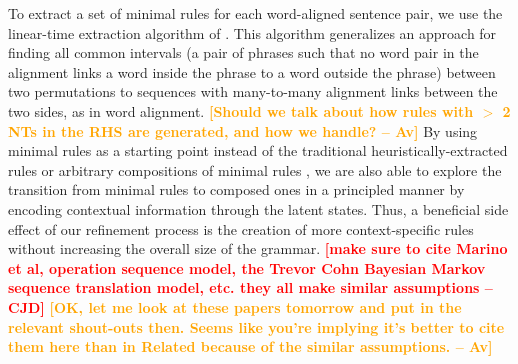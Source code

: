 \documentclass[11pt]{article}
\newcommand{\cjd}[1]{\textcolor{red}{\textbf{[#1 --CJD] }}}
\newcommand{\shaycomment}[1]{\textcolor{blue}{#1 -- Shay}}
\newcommand{\avcomment}[1]{\textcolor{orange}{\textbf{[#1 -- Av]}}}
\begin{document}
To extract a set of minimal rules for each word-aligned sentence pair, we use the linear-time extraction algorithm of .  
This algorithm generalizes an approach for finding all common intervals (a pair of phrases such that no word pair in the alignment links a word inside the phrase to a word outside the phrase) between two permutations to sequences with many-to-many alignment links between the two sides, as in word alignment. 
\avcomment{Should we talk about how rules with $>$ 2 NTs in the RHS are generated, and how we handle?}
By using minimal rules as a starting point instead of the traditional heuristically-extracted rules \cite{Chiang2005} or arbitrary compositions of minimal rules \cite{Galley2006}, we are also able to explore the transition from minimal rules to composed ones in a principled manner by encoding contextual information through the latent states.   
Thus, a beneficial side effect of our refinement process is the creation of more context-specific rules without increasing the overall size of the grammar.
\cjd{make sure to cite Marino et al, operation sequence model, the Trevor Cohn Bayesian Markov sequence translation model, etc. they all make similar assumptions}
\avcomment{OK, let me look at these papers tomorrow and put in the relevant shout-outs then.  Seems like you're implying it's better to cite them here than in Related because of the similar assumptions.}
\end{document}

